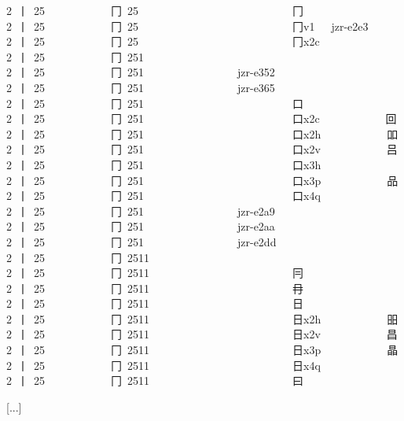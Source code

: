 2 {\cjk{}丨} 25            {\cjk{}冂} 25                            {\cjk{}冂} 
2 {\cjk{}丨} 25            {\cjk{}冂} 25                            {\cjk{}冂}v1   jzr-e2e3  {} 
2 {\cjk{}丨} 25            {\cjk{}冂} 25                            {\cjk{}冂}x2c            {} 
2 {\cjk{}丨} 25            {\cjk{}冂} 251                           {\cjk{}} 
2 {\cjk{}丨} 25            {\cjk{}冂} 251                 jzr-e352  {} 
2 {\cjk{}丨} 25            {\cjk{}冂} 251                 jzr-e365  {} 
2 {\cjk{}丨} 25            {\cjk{}冂} 251                           {\cjk{}口} 
2 {\cjk{}丨} 25            {\cjk{}冂} 251                           {\cjk{}口}x2c            {\cjk{}回} 
2 {\cjk{}丨} 25            {\cjk{}冂} 251                           {\cjk{}口}x2h            {\cjk{}吅} 
2 {\cjk{}丨} 25            {\cjk{}冂} 251                           {\cjk{}口}x2v            {\cjk{}吕} 
2 {\cjk{}丨} 25            {\cjk{}冂} 251                           {\cjk{}口}x3h            {} 
2 {\cjk{}丨} 25            {\cjk{}冂} 251                           {\cjk{}口}x3p            {\cjk{}品} 
2 {\cjk{}丨} 25            {\cjk{}冂} 251                           {\cjk{}口}x4q            {} 
2 {\cjk{}丨} 25            {\cjk{}冂} 251                 jzr-e2a9  {} 
2 {\cjk{}丨} 25            {\cjk{}冂} 251                 jzr-e2aa  {} 
2 {\cjk{}丨} 25            {\cjk{}冂} 251                 jzr-e2dd  {} 
2 {\cjk{}丨} 25            {\cjk{}冂} 2511                          {\cjk{}} 
2 {\cjk{}丨} 25            {\cjk{}冂} 2511                          {\cjk{}冃} 
2 {\cjk{}丨} 25            {\cjk{}冂} 2511                          {\cjk{}冄} 
2 {\cjk{}丨} 25            {\cjk{}冂} 2511                          {\cjk{}日} 
2 {\cjk{}丨} 25            {\cjk{}冂} 2511                          {\cjk{}日}x2h            {\cjk{}昍} 
2 {\cjk{}丨} 25            {\cjk{}冂} 2511                          {\cjk{}日}x2v            {\cjk{}昌} 
2 {\cjk{}丨} 25            {\cjk{}冂} 2511                          {\cjk{}日}x3p            {\cjk{}晶} 
2 {\cjk{}丨} 25            {\cjk{}冂} 2511                          {\cjk{}日}x4q            {} 
2 {\cjk{}丨} 25            {\cjk{}冂} 2511                          {\cjk{}曰} 
 
[...] 
 
